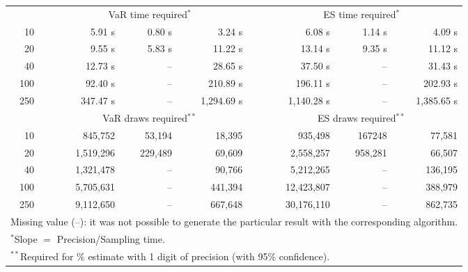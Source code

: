 {{\begin{longtable}{rr rrr r rrr}
\hline 
 & & \multicolumn{3}{c}{VaR time required$^{*}$} && \multicolumn{3}{c}{ES time required$^{*}$} \\ \cline{3-5}  \cline{7-9}
10 & & 5.91 s & 0.80 s & 3.24 s && 6.08 s & 1.14 s & 4.09 s \\ 
20 & & 9.55 s & 5.83 s & 11.22 s && 13.14 s & 9.35 s & 11.12 s \\ 
40 & & 12.73 s &  -- & 28.65 s && 37.50 s &  -- & 31.43 s \\ 
100 & & 92.40 s &  -- & 210.89 s && 196.11 s &  -- & 202.93 s \\ 
250 & & 347.47 s &  -- & 1,294.69 s && 1,140.28 s &  -- & 1,385.65 s \\ 
\hline 
 && \multicolumn{3}{c}{VaR draws required$^{**}$} &&   \multicolumn{3}{c}{ES draws required$^{**}$} \\  \cline{3-5}  \cline{7-9} 
10 & & 845,752 & 53,194 & 18,395 && 935,498 & 167248 & 77,581 \\ 
20 & & 1,519,296 & 229,489 & 69,609 && 2,558,257 & 958,281 & 66,507 \\ 
40 & & 1,321,478 & -- & 90,766 && 5,212,265 & -- & 136,195 \\ 
100 & & 5,705,631 & -- & 441,394 && 12,423,807 & -- & 388,979 \\ 
250 & & 9,112,650 & -- & 667,648 && 30,176,110 & -- & 862,735 \\ 
\hline 
\multicolumn{9}{p{10cm}}{\footnotesize{Missing value (--): it was not possible to generate the particular result with the corresponding algorithm.}} \\ 
\multicolumn{9}{l}{\footnotesize{$^{*}$Slope $=$ Precision/Sampling time.}}  \\ 
\multicolumn{9}{l}{\footnotesize{$^{**}$Required for \% estimate with 1 digit of precision (with 95\% confidence).}} \\ 
\end{longtable} 
} 
} 
\normalsize 
